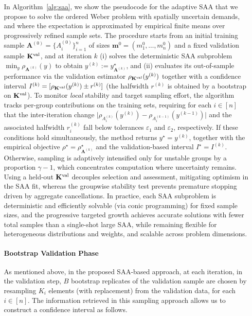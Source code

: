 \documentclass[letter,11pt, reqno]{amsart}
\renewcommand{\;}{\quad}
\theoremstyle{thmstyleone}%
\theoremstyle{thmstyletwo}%
\theoremstyle{thmstylethree}%
\begin{document}
In Algorithm~\ref{alg:saa}, we show the pseudocode for the adaptive SAA that we propose to solve the ordered Weber problem with spatially uncertain demands, and 
where the expectation is approximated by empirical finite means over progressively refined sample sets. The procedure starts from an initial training sample $\mathbf{A}^{(0)}=\{A_i^{(0)}\}_{i=1}^n$ of sizes $\mathbf{m}^{0}=(m_1^0,\ldots,m_n^0)$ and a fixed validation sample $\mathbf{K}^{\rm val}$, and at iteration $k$ (i) solves the deterministic SAA subproblem $\min_y \rho_{\mathbf{A}^{(k)}}(y)$ to obtain $y^{(k)}:=y^\star_{\mathbf{A}^{(k)}}$, and (ii) evaluates its out-of-sample performance via the validation estimator $\rho_{\mathbf{K}^{\rm val}}(y^{(k)})$ together with a confidence interval $I^{(k)}=[\rho_{\mathbf{K}^{\rm val}}(y^{(k)})\pm r^{(k)}]$ (the halfwidth $r^{(k)}$ is obtained by a bootstrap on $\mathbf{K}^{\rm val}$). To monitor \emph{local} stability and target sampling effort, the algorithm tracks per-group contributions on the training sets, requiring for each $i\in[n]$ that the inter-iteration change $\big|\rho_{A_i^{(k)}}(y^{(k)})-\rho_{A_i^{(k-1)}}(y^{(k-1)})\big|$ and the associated halfwidth $r_i^{(k)}$ fall below tolerances $\varepsilon_1$ and $\varepsilon_2$, respectively. If these conditions hold simultaneously, the method returns $y^\star=y^{(k)}$, together with the empirical objective $\rho^\star=\rho^\star_{\mathbf{A}^{(k)}}$ and the validation-based interval $I^\star=I^{(k)}$. Otherwise, sampling is adaptively intensified only for unstable groups by a proportion $\gamma-1$, which concentrates computation where uncertainty remains. Using a held-out $\mathbf{K}^{\rm val}$ decouples selection and assessment, mitigating optimism in the SAA fit, whereas the groupwise stability test prevents premature stopping driven by aggregate cancellations. In practice, each SAA subproblem is deterministic and efficiently solvable (via conic programming) for fixed sample sizes, and the progressive targeted growth achieves accurate solutions with fewer total samples than a single-shot large SAA, while remaining flexible for heterogeneous distributions and weights, and scalable across problem dimensions.

\paragraph{\bf Bootstrap Validation Phase}

As mentioned above, in the proposed SAA-based approach, at each iteration, in the validation step, $B$ bootstrap replicates of the validation sample are chosen by resampling $K_i$ elements (with replacement) from the validation data, for each $i \in [n]$. The information retrieved in this sampling approach allows us to construct a confidence interval as follows.
\end{document}

